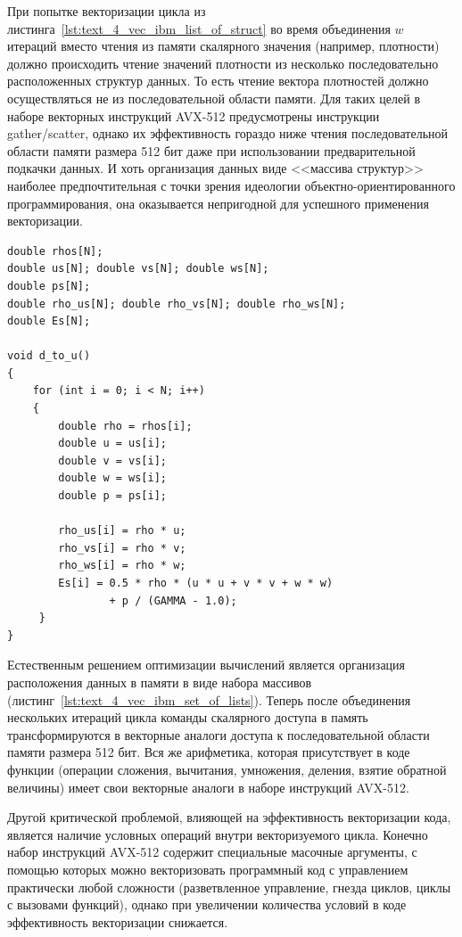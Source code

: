 При попытке векторизации цикла из листинга~\ref{lst:text_4_vec_ibm_list_of_struct} во время объединения $w$ итераций вместо чтения из памяти скалярного значения (например, плотности) должно происходить чтение значений плотности из несколько последовательно расположенных структур данных.
То есть чтение вектора плотностей должно осуществляться не из последовательной области памяти.
Для таких целей в наборе векторных инструкций AVX-512 предусмотрены инструкции gather/scatter, однако их эффективность гораздо ниже чтения последовательной области памяти размера 512 бит даже при использовании предварительной подкачки данных.
И хоть организация данных виде <<массива структур>> наиболее предпочтительная с точки зрения идеологии объектно-ориентированного программирования, она оказывается непригодной для успешного применения векторизации.

\begin{lstlisting}[caption={Организация данных в виде <<набор массивов>>.},label={lst:text_4_vec_ibm_set_of_lists}]
double rhos[N];
double us[N]; double vs[N]; double ws[N];
double ps[N];
double rho_us[N]; double rho_vs[N]; double rho_ws[N];
double Es[N];

void d_to_u()
{
    for (int i = 0; i < N; i++)
    {
        double rho = rhos[i];
        double u = us[i];
        double v = vs[i];
        double w = ws[i];
        double p = ps[i];

        rho_us[i] = rho * u;
        rho_vs[i] = rho * v;
        rho_ws[i] = rho * w;
        Es[i] = 0.5 * rho * (u * u + v * v + w * w)
                + p / (GAMMA - 1.0);
     }
}
\end{lstlisting}

Естественным решением оптимизации вычислений является организация расположения данных в памяти в виде набора массивов (листинг~\ref{lst:text_4_vec_ibm_set_of_lists}).
Теперь после объединения нескольких итераций цикла команды скалярного доступа в память трансформируются в векторные аналоги доступа к последовательной области памяти размера 512 бит.
Вся же арифметика, которая присутствует в коде функции (операции сложения, вычитания, умножения, деления, взятие обратной величины) имеет свои векторные аналоги в наборе инструкций AVX-512.

Другой критической проблемой, влияющей на эффективность векторизации кода, является наличие условных операций внутри векторизуемого цикла.
Конечно набор инструкций AVX-512 содержит специальные масочные аргументы, с помощью которых можно векторизовать программный код с управлением практически любой сложности (разветвленное управление, гнезда циклов, циклы с вызовами функций), однако при увеличении количества условий в коде эффективность векторизации снижается.

